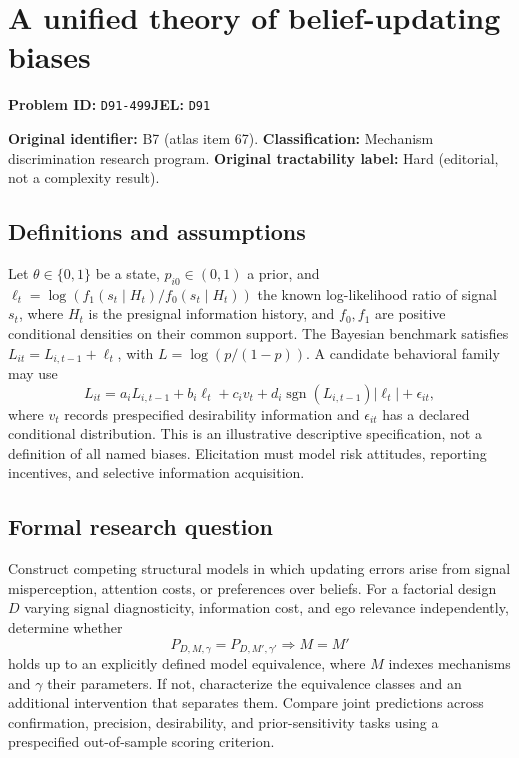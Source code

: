 \documentclass[11pt,a4paper]{article}
\begin{document}
\section*{A unified theory of belief-updating biases}
\textbf{Problem ID:} \texttt{D91-499}\quad \textbf{JEL:} \texttt{D91}\par
\label{problem:OP-0067}
\label{atlas:prob:B7}

\noindent\textbf{Original identifier:} B7 (atlas item 67). \textbf{Classification:} Mechanism discrimination research program. \textbf{Original tractability label:} Hard (editorial, not a complexity result).

\subsection*{Definitions and assumptions}

Let $\theta\in\{0,1\}$ be a state, $p_{i0}\in(0,1)$ a prior, and $\ell_t=\log(f_1(s_t\mid H_t)/f_0(s_t\mid H_t))$ the known log-likelihood ratio of signal $s_t$, where $H_t$ is the presignal information history, and $f_0,f_1$ are positive conditional densities on their common support. The Bayesian benchmark satisfies $L_{it}=L_{i,t-1}+\ell_t$, with $L=\log(p/(1-p))$. A candidate behavioral family may use
\[
L_{it}=a_iL_{i,t-1}+b_i\ell_t+c_i v_t+d_i\operatorname{sgn}(L_{i,t-1})|\ell_t|+\epsilon_{it},
\]
where $v_t$ records prespecified desirability information and $\epsilon_{it}$ has a declared conditional distribution. This is an illustrative descriptive specification, not a definition of all named biases. Elicitation must model risk attitudes, reporting incentives, and selective information acquisition.

\subsection*{Formal research question}

Construct competing structural models in which updating errors arise from signal misperception, attention costs, or preferences over beliefs. For a factorial design $D$ varying signal diagnosticity, information cost, and ego relevance independently, determine whether
\[
P_{D,M,\gamma}=P_{D,M',\gamma'}\Longrightarrow M=M'
\]
holds up to an explicitly defined model equivalence, where $M$ indexes mechanisms and $\gamma$ their parameters. If not, characterize the equivalence classes and an additional intervention that separates them. Compare joint predictions across confirmation, precision, desirability, and prior-sensitivity tasks using a prespecified out-of-sample scoring criterion.
\end{document}
